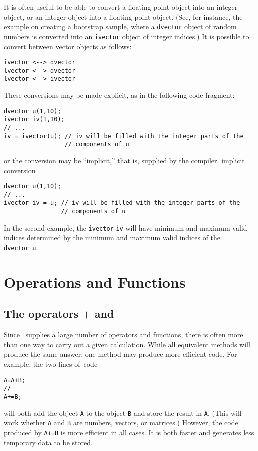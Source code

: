 \documentclass{admbmanual}
\begin{document}
It is often useful to be able to convert a floating point object into
an integer object, or an integer object into a floating point object.
(See, for instance, the example on creating a bootstrap sample, 
where a \texttt{dvector} object
of random numbers is converted into an \texttt{ivector} object of
integer indices.)
It is possible to convert between vector objects as follows:
\begin{lstlisting}
ivector <--> dvector
lvector <--> dvector
lvector <--> ivector
\end{lstlisting}

These conversions may be made explicit, as in the following code fragment:
\begin{lstlisting}
dvector u(1,10);
ivector iv(1,10);
// ...
iv = ivector(u); // iv will be filled with the integer parts of the 
                 // components of u
\end{lstlisting}
or the conversion may be ``implicit,'' that is, supplied by the
compiler. 
{implicit conversion}
\begin{lstlisting}
dvector u(1,10);
// ...
ivector iv = u; // iv will be filled with the integer parts of the 
                // components of u
\end{lstlisting}

In the second example, the \texttt{ivector} \texttt{iv} 
will have minimum and maximum valid
indices determined by the minimum and maximum valid indices of the
\texttt{dvector}~\texttt{u}.




\chapter{Operations and Functions}


\section{The operators  $+$ and  $-$} 

Since \scAD\ supplies a large number of operators and functions,
there is often more than one way to carry out a given calculation.
While all equivalent methods will produce the same answer,
one method may produce more efficient code. For example,
the two lines of~code
\begin{lstlisting}
A=A+B;
//
A+=B;
\end{lstlisting}
will both add the object \texttt{A}  to the object \texttt{B}
and store the result in \texttt{A}. (This will work whether \texttt{A} and \texttt{B}
 are numbers,
vectors, or matrices.) However, the code produced by \texttt{A+=B}  
is more efficient in all cases. It is both faster and generates
less temporary data to be stored.
\end{document}
